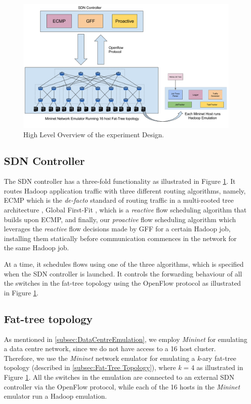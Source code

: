 \begin{figure}[!ht] 
\centerline{\includegraphics[scale=0.42]{graphics/chapter4/DesignOverview.png}}
\caption{High Level Overview of the experiment Design.}
\label{fig:DesignOverview}
\end{figure}

\subsection{SDN Controller}
The SDN controller has a three-fold functionality as illustrated in Figure \ref{fig:DesignOverview}. It routes Hadoop application traffic with three different routing algorithms, namely, ECMP \cite{hopps2000analysis} which is the \textit{de-facto} standard of routing traffic in a multi-rooted tree architecture \cite{al2008scalable}, Global First-Fit \cite{al2010hedera}, which is a \textit{reactive} flow scheduling algorithm that builds upon ECMP, and finally, our \textit{proactive} flow scheduling algorithm which leverages the \textit{reactive} flow decisions made by GFF for a certain Hadoop job, installing them statically before communication commences in the network for the same Hadoop job. 

At a time, it schedules flows using one of the three algorithms, which is specified when the SDN controller is launched. It controls the forwarding behaviour of all the switches in the fat-tree topology using the OpenFlow \cite{mckeown2008openflow} protocol as illustrated in Figure \ref{fig:DesignOverview}. 

\subsection{Fat-tree topology}

As mentioned in \ref{subsec:DataCentreEmulation}, we employ \textit{Mininet} \cite{lantz2010network} for emulating a data centre network, since we do not have access to a 16 host cluster. Therefore, we use the \textit{Mininet} network emulator for emulating a \textit{k}-ary fat-tree topology (described in \ref{subsec:Fat-Tree Topology}), where \textit{k} = 4 as illustrated in Figure \ref{fig:DesignOverview}. All the switches in the emulation are connected to an external SDN controller via the OpenFlow protocol, while each of the 16 hosts in the \textit{Mininet} emulator run a Hadoop emulation.

